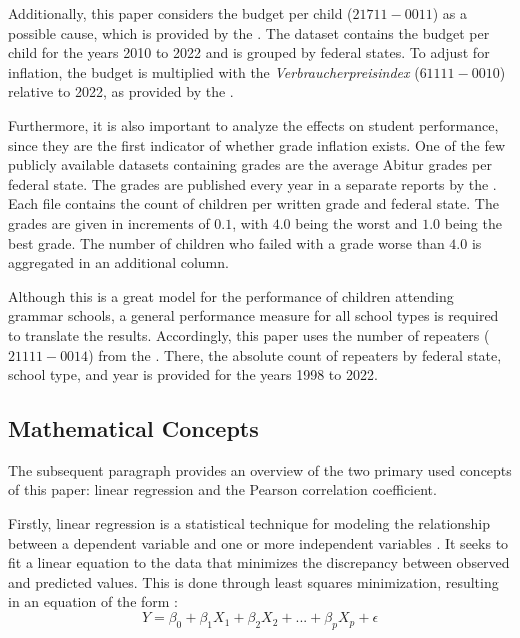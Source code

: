 Additionally, this paper considers the budget per child (\href{https://www-genesis.destatis.de/genesis//online?operation=table&code=21711-0011&bypass=true&levelindex=0&levelid=1706352648560#abreadcrumb}{$21711-0011$}) as a possible cause, which is provided  by the \citeauthor{statistische_bundesamt_statistisches_2024}. The dataset contains the budget per child for the years 2010 to 2022 and is grouped by federal states. To adjust for inflation, the budget is multiplied with the \textit{Verbraucherpreisindex} (\href{https://www-genesis.destatis.de/genesis//online?operation=table&code=61111-0010&bypass=true&levelindex=0&levelid=1706352769529#abreadcrumb}{$61111-0010$}) relative to 2022, as provided by the \citeauthor{statistische_bundesamt_statistisches_2024}. 


Furthermore, it is also important to analyze the  effects on student performance, since they are the first indicator of whether grade inflation exists. One of the few publicly available datasets containing grades are the average Abitur grades per federal state. The grades are published every year in a separate reports by the \citeauthor{kultusminister_konferenz_abiturnoten_nodate}. Each file contains the count of children per written grade and federal state. The grades are given in increments of $0.1$, with $4.0$  being the worst and $1.0$ being the best grade. The number of children who failed with a grade worse than $4.0$ is aggregated in an additional column. 

Although this is a great model for the performance of children attending grammar schools, a general performance measure for all school types is required to translate the results. Accordingly, this paper uses the number of repeaters (\href{https://www-genesis.destatis.de/genesis//online?operation=table&code=21111-0014&bypass=true&levelindex=0&levelid=1706352887288#abreadcrumb}{$21111-0014$}) from the \citeauthor{statistische_bundesamt_statistisches_2024}. There, the absolute count of repeaters by federal state, school type, and year is provided for the years 1998 to 2022.

\subsection{Mathematical Concepts}
The subsequent paragraph provides an overview of the two primary used concepts of this paper: linear regression and the Pearson correlation coefficient.

Firstly, linear regression is a statistical technique for modeling the relationship between a dependent variable and one or more independent variables \cite{james_introduction_2021}. It seeks to fit a linear equation to the data that minimizes the discrepancy between observed and predicted values. This is done through least squares minimization, resulting in an equation of the form \cite{james_introduction_2021}:
\begin{equation}
    Y = \beta_0 + \beta_1 X_1 + \beta_2 X_2 +  ...+ \beta_p X_p + \epsilon 
\end{equation}

